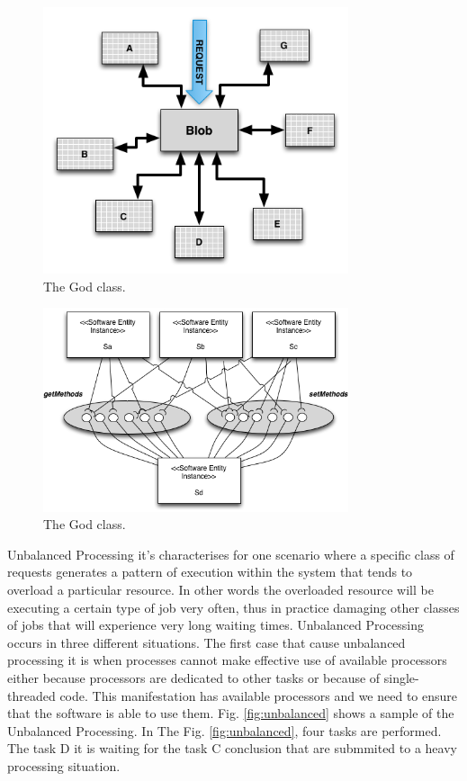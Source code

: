 \begin{figure}[h]
\centering
\includegraphics[width=0.8\textwidth]{./images/BLOB.png}
\caption{The God class\cite{Wert2013a}. }
\label{fig:godclass}
\end{figure}
\begin{figure}[h]
\centering
\includegraphics[width=0.8\textwidth]{./images/blob2.png}
\caption{The God class\cite{Vetoio2011}. }
\label{fig:godclass2}
\end{figure}

Unbalanced Processing it's characterises for one scenario where a specific class of requests generates a pattern of execution within the system that tends to overload a particular resource. In other words the overloaded resource will be executing a certain type of job very often, thus in practice damaging other classes
of jobs that will experience very long waiting times. Unbalanced Processing occurs in three different situations. The first case that cause unbalanced processing it is when processes cannot make effective use of available processors either because processors are dedicated to other tasks or because of single-threaded code. This manifestation has available processors and we need to ensure that the software is able to use them. Fig. \ref{fig:unbalanced}  shows a sample of the Unbalanced Processing. In The Fig. \ref{fig:unbalanced}, four tasks are performed. The task D it is waiting for the task C conclusion that are submmited to a heavy processing situation. 

